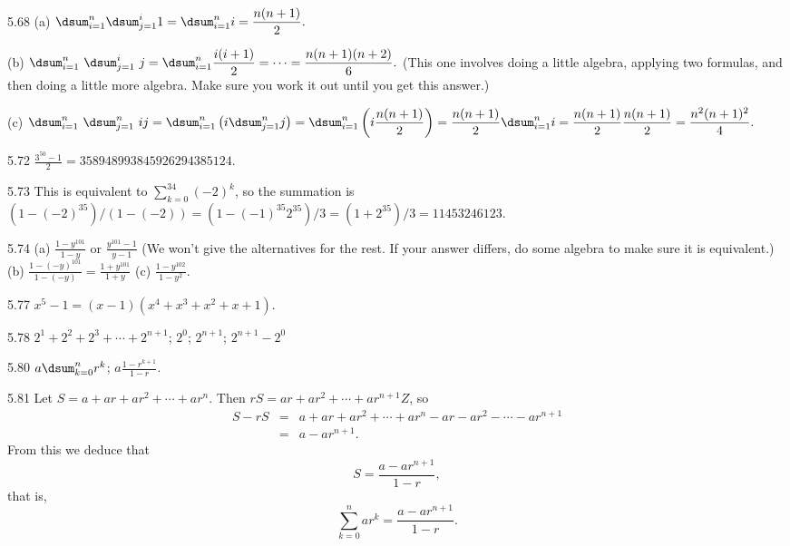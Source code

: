 \begin{Answer}{5.68}
(a)
$\dsum _{i=1}^n \dsum _{j=1}^i 1 = \dsum _{i=1}^n i = \dfrac{n(n+1)}{2}.$

\noindent
(b) $\dsum _{i=1}^n \ \dsum _{j=1}^i\ j
= \dsum _{i=1}^n \dfrac{i(i+1)}{2} = \cdots = \dfrac{n(n+1)(n+2)}{6}.$
(This one involves doing a little algebra, applying two formulas, and then doing a little more
algebra.  Make sure you work it out until you get this answer.)

\noindent
(c)
$\dsum _{i=1}^n \ \dsum _{j=1}^n\ ij=
\dsum _{i=1}^n\left( i\dsum _{j=1}^n j\right)=
\dsum _{i=1}^n\left( i\dfrac{n(n+1)}{2}\right)=
\dfrac{n(n+1)}{2}\dsum _{i=1}^n i=
\dfrac{n(n+1)}{2}\dfrac{n(n+1)}{2}=
\dfrac{n^2(n+1)^2}{4}.$
\end{Answer}
\begin{Answer}{5.72}
$\frac{3^{50} - 1}{2}=358948993845926294385124$.
\end{Answer}
\begin{Answer}{5.73}
This is equivalent to $\sum_{k=0}^{34}(-2)^k$,
 so the summation is
 $(1-(-2)^{35})/(1-(-2))=(1-(-1)^{35}2^{35})/3=(1+2^{35})/3=11453246123$.
\end{Answer}
\begin{Answer}{5.74}
 (a) $\frac{1 - y^{101}}{1 - y}$ or $\frac{y^{101}-1}{y-1}$ (We won't give the alternatives for the rest.
 If your answer differs, do some algebra to make sure it is equivalent.)
 (b) $\frac{1 -(-y)^{101}}{1 - (-y)} = \frac{1 + y^{101}}{1 + y}$
 (c) $\frac{1 - y^{102}}{1 - y^2}$.
\end{Answer}
\begin{Answer}{5.77}
$x^5-1=(x-1)(x^4+x^3+x^2+x+1)$.
\end{Answer}
\begin{Answer}{5.78}
$2^1+2^2 + 2^3  + \cdots + 2^{n+1}$;
$2^0$;
$2^{n+1}$;
$2^{n+1}-2^0$
\end{Answer}
\begin{Answer}{5.80}
$a\dsum_{k=0}^{n}r^k$;
$a\frac{1-r^{k+1}}{1-r}$.
\end{Answer}
\begin{Answer}{5.81}
Let $S = a + ar + ar^2 + \cdots + ar^{n}.$
Then $rS = ar + ar^2 + \cdots + ar^{n+1}Z$, so
\begin{eqnarray*}
S - rS &=& a + ar + ar^2 + \cdots + ar^{n} - ar - ar^2 - \cdots - ar^{n+1}\\
&=& a - ar^{n+1}.
\end{eqnarray*}
From this we deduce that $$S = \frac{a - ar^{n+1}}{1 - r},$$
that is,
$$ \sum_{k=0}^{n}ar^k= \frac{a - ar^{n+1}}{1 - r}.$$
\end{Answer}
